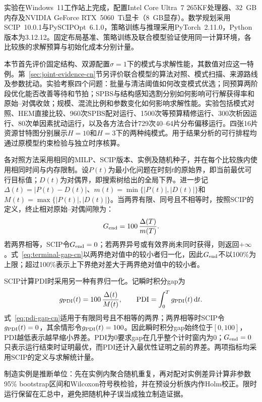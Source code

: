 \documentclass[final,5p,times,twocolumn]{elsarticle}
\newcommand{\pdi}{\mathrm{PDI}}
\begin{document}
实验在Windows~11工作站上完成，配置Intel Core Ultra~7 265KF处理器、32~GB内存及NVIDIA GeForce RTX~5060~Ti显卡（8~GB显存）。数学规划采用SCIP~10.0.1与PySCIPOpt~6.1.0，策略训练与推理采用PyTorch~2.11.0，Python版本为3.12.12。固定布局基准、策略训练及联合模型验证使用同一计算环境，各比较族的求解预算与初始化成本分别计量。

本节首先评价固定结构、双源配置$\sigma=1$下的模式与求解性能，其数值对应这一特例。第~\ref{sec:joint-evidence-cn}节另评价联合模型的算法对照、模式扫描、来源路线及参数扰动。实验考察四个问题：批量与清洁阈值如何改变模式优选；同预算两阶段优化能否改善等待和节拍；SPBS与结构感知选割分别如何影响可行解获得率和原始--对偶收敛；规模、混流比例和参数变化如何影响求解性能。实验包括模式对照、HEM直接比较、960次SPBS配对运行、1500次等预算精修运行、300次析因运行、80次单因素扰动运行，以及各方法合计729次40--64片分布偏移运行。四张16片资源甘特图分别展示$H=10$和$H=3$下的两种纯模式。用于结果分析的可行排程均通过原模型约束检验与独立时序核算。

各对照方法采用相同的MILP、SCIP版本、实例及随机种子，并在每个比较族内使用相同时间与内存限制。设$P(t)$为最小化问题在时刻$t$的原始界，即当前最优可行目标值；$D(t)$为对偶界，即搜索树给出的全局下界。进一步记$\Delta(t)=|P(t)-D(t)|$、$m(t)=\min\{|P(t)|,|D(t)|\}$和$M(t)=\max\{|P(t)|,|D(t)|\}$。当两界有限、同号且不相等时，按照SCIP的定义，终止相对原始--对偶间隙为：
\begin{equation}
G_{\rm end}=100\,\frac{\Delta(T)}{m(T)}.
\label{eq:terminal-gap-cn}
\end{equation}
若两界相等，SCIP令$G_{\rm end}=0$；若两界异号或有效界尚未同时获得，则返回$+\infty$。式~\eqref{eq:terminal-gap-cn}以两界绝对值中的较小者归一化，因此$G_{\rm end}$不以100\%为上限；超过100\%表示上下界绝对差大于两界绝对值中的较小者。

SCIP计算PDI时采用另一种有界归一化。记瞬时积分gap为
\begin{equation}
g_{\rm PDI}(t)=100\,\frac{\Delta(t)}{M(t)},\qquad
\pdi=\int_0^T g_{\rm PDI}(t)\,\mathrm dt.
\label{eq:pdi-gap-cn}
\end{equation}
式~\eqref{eq:pdi-gap-cn}适用于有限同号且不相等的两界；两界相等时SCIP令$g_{\rm PDI}(t)=0$，其余情形令$g_{\rm PDI}(t)=100$。因此瞬时积分gap始终位于$[0,100]$，PDI越低表示越早缩小界差。PDI为0要求gap在几乎整个计时窗内为0；$G_{\rm end}=0$只表示运行结束时证明最优，而PDI还计入最优性证明之前的界差。两项指标均采用SCIP的定义与求解统计量\citep{achterberg2009scip,bestuzheva2023scip}。

制造实例是推断单位：先在实例内聚合随机重复，再对配对实例差异计算非参数95\% bootstrap区间和Wilcoxon符号秩检验，并在预设分析族内作Holm校正。限时运行保留在汇总中，避免把随机种子误当成独立制造证据。
\end{document}
